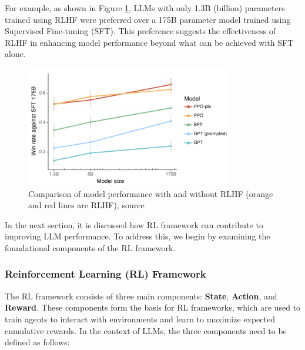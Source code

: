 For example, as shown in Figure \ref{fig:instruct}, 
LLMs with only 1.3B (billion) parameters trained using RLHF were 
preferred over a 175B parameter model trained using Supervised Fine-tuning (SFT). 
This preference suggests the effectiveness of RLHF in enhancing model
performance beyond what can be achieved with SFT alone.


\begin{figure}[h]
    \centering
    \includegraphics[width=0.8\textwidth]{./figures/instruct.png}
    \caption{Comparison of model performance with and without RLHF (orange and red lines are RLHF), 
    source \cite{ouyangTrainingLanguageModels2022}}
    \label{fig:instruct}
\end{figure}


In the next section, it is discussed how RL framework can contribute to improving LLM performance. To address this, 
we begin by examining the foundational components of the RL framework.

\subsubsection{Reinforcement Learning (RL) Framework} \label{subsec:rl-framework}


The RL framework consists of three main components: \textbf{State}, \textbf{Action}, and \textbf{Reward}. 
These components form the basis for RL frameworks, which are used to train agents to interact with
environments and learn to maximize expected cumulative rewards. In the context of LLMs, the three components
need to be defined as follows:

